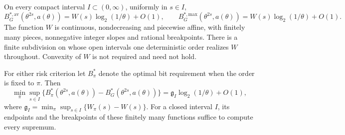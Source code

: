 \begin{theorem}\label{thm:v26-phases}
On every compact interval $I\subset(0,\infty)$, uniformly in $s\in I$,
\begin{equation}\label{eq:v26-phase-law}
 B_G^{*,\mathrm{av}}(\theta^{2s},a(\theta))
 =W(s)\log_2(1/\theta)+O(1),\qquad
 B_G^{*,\mathrm{max}}(\theta^{2s},a(\theta))
 =W(s)\log_2(1/\theta)+O(1).
\end{equation}
The function $W$ is continuous, nondecreasing and piecewise affine,
with finitely many pieces, nonnegative integer slopes and rational
breakpoints. There is a finite subdivision on whose open intervals
one deterministic order realizes $W$ throughout. Convexity of $W$
is not required and need not hold.

For either risk criterion let $B_\pi^*$ denote the optimal bit
requirement when the order is fixed to $\pi$. Then
\begin{equation}\label{eq:v26-regret-law}
 \min_\pi\sup_{s\in I}
 \{B_\pi^*(\theta^{2s},a(\theta))-B_G^*(\theta^{2s},a(\theta))\}
 =\mathfrak g_I\log_2(1/\theta)+O(1),
\end{equation}
where
$\mathfrak g_I=\min_\pi\sup_{s\in I}\{W_\pi(s)-W(s)\}$.
For a closed interval $I$, its endpoints and the breakpoints of these
finitely many functions suffice to compute every supremum.
\end{theorem}
